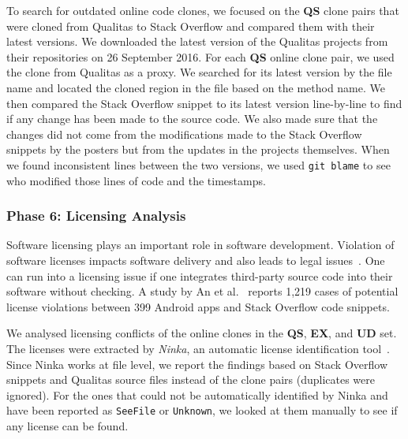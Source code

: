 \documentclass[sigconf,review, anonymous]{acmart}
\begin{document}
To search for outdated online code clones, we focused on the
\textbf{QS} clone pairs that were cloned from Qualitas to Stack
Overflow and compared them with their latest versions. We downloaded
the latest version of the Qualitas projects from their repositories on
26 September 2016. For each \textbf{QS} online clone pair, we used the
clone from Qualitas as a proxy. We searched for its latest version by
the file name and located the cloned region in the file based on the
method name.
We then compared the Stack Overflow snippet to its latest version
line-by-line to find if any change has been made to the source
code. We also made sure that the changes did not come from the
modifications made to the Stack Overflow snippets by the posters but
from the updates in the projects themselves. When we found
inconsistent lines between the two versions, we used
{\small\texttt{git blame}} to see who modified those lines of code and
the timestamps.

\subsubsection{Phase 6: Licensing Analysis}
Software licensing plays an important role in software
development. Violation of software licenses impacts software delivery
and also leads to legal issues~\cite{Sprigman2015}.
One can run into a licensing issue if one integrates third-party
source code into their software without checking. A study by An et
al.~\cite{An2017} reports 1,219 cases of potential license violations
between 399 Android apps and Stack Overflow code
snippets.

We analysed licensing conflicts of the online clones in the
\textbf{QS}, \textbf{EX}, and \textbf{UD} set. The
licenses were extracted by \emph{Ninka}, an automatic license
identification tool~\cite{German2010}. Since Ninka works at file
level, we report the findings based on Stack Overflow snippets and
Qualitas source files instead of the clone pairs (duplicates were
ignored). For the ones that could not be automatically identified by
Ninka and have been reported as {\small\texttt{SeeFile}} or
{\small\texttt{Unknown}}, we looked at them manually to see if any
license can be found. 

\end{document}
